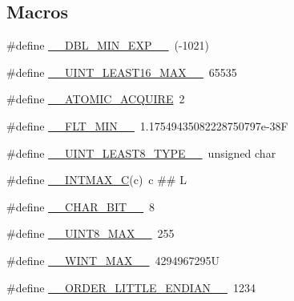 \subsection*{Macros}
\begin{DoxyCompactItemize}
\item 
\#define \hyperlink{build-analizer__host-_desktop___qt__5__9__0___g_c_c__64bit-debug_2moc__predefs_8h_a63d6f5d1c3371192fe03b3fb06e82400}{\+\_\+\+\_\+\+D\+B\+L\+\_\+\+M\+I\+N\+\_\+\+E\+X\+P\+\_\+\+\_\+}~(-\/1021)
\item 
\#define \hyperlink{build-analizer__host-_desktop___qt__5__9__0___g_c_c__64bit-debug_2moc__predefs_8h_a6a762b969d5eea9e6a8db715a5f5a1a9}{\+\_\+\+\_\+\+U\+I\+N\+T\+\_\+\+L\+E\+A\+S\+T16\+\_\+\+M\+A\+X\+\_\+\+\_\+}~65535
\item 
\#define \hyperlink{build-analizer__host-_desktop___qt__5__9__0___g_c_c__64bit-debug_2moc__predefs_8h_a72e3c30a05bd2bb63d76550e451a438e}{\+\_\+\+\_\+\+A\+T\+O\+M\+I\+C\+\_\+\+A\+C\+Q\+U\+I\+R\+E}~2
\item 
\#define \hyperlink{build-analizer__host-_desktop___qt__5__9__0___g_c_c__64bit-debug_2moc__predefs_8h_a6e947aa0a2cb4808d560339fef0d4793}{\+\_\+\+\_\+\+F\+L\+T\+\_\+\+M\+I\+N\+\_\+\+\_\+}~1.\+17549435082228750797e-\/38\+F
\item 
\#define \hyperlink{build-analizer__host-_desktop___qt__5__9__0___g_c_c__64bit-debug_2moc__predefs_8h_a5a8c0a31337df765b55c6260ef58e51e}{\+\_\+\+\_\+\+U\+I\+N\+T\+\_\+\+L\+E\+A\+S\+T8\+\_\+\+T\+Y\+P\+E\+\_\+\+\_\+}~unsigned char
\item 
\#define \hyperlink{build-analizer__host-_desktop___qt__5__9__0___g_c_c__64bit-debug_2moc__predefs_8h_adb0d09cff489746c5456407aa832fced}{\+\_\+\+\_\+\+I\+N\+T\+M\+A\+X\+\_\+\+C}(c)~c \#\# L
\item 
\#define \hyperlink{build-analizer__host-_desktop___qt__5__9__0___g_c_c__64bit-debug_2moc__predefs_8h_ab35e271dce6e7e2190d60b5905375419}{\+\_\+\+\_\+\+C\+H\+A\+R\+\_\+\+B\+I\+T\+\_\+\+\_\+}~8
\item 
\#define \hyperlink{build-analizer__host-_desktop___qt__5__9__0___g_c_c__64bit-debug_2moc__predefs_8h_afd12ac7489bdbbed7fa3cc51023b8f73}{\+\_\+\+\_\+\+U\+I\+N\+T8\+\_\+\+M\+A\+X\+\_\+\+\_\+}~255
\item 
\#define \hyperlink{build-analizer__host-_desktop___qt__5__9__0___g_c_c__64bit-debug_2moc__predefs_8h_a8925e15bce319fa2f42c659f6a3e0199}{\+\_\+\+\_\+\+W\+I\+N\+T\+\_\+\+M\+A\+X\+\_\+\+\_\+}~4294967295\+U
\item 
\#define \hyperlink{build-analizer__host-_desktop___qt__5__9__0___g_c_c__64bit-debug_2moc__predefs_8h_a2b695357ce4b46971d54e8e9dfe5724f}{\+\_\+\+\_\+\+O\+R\+D\+E\+R\+\_\+\+L\+I\+T\+T\+L\+E\+\_\+\+E\+N\+D\+I\+A\+N\+\_\+\+\_\+}~1234

\end{DoxyCompactItemize}
